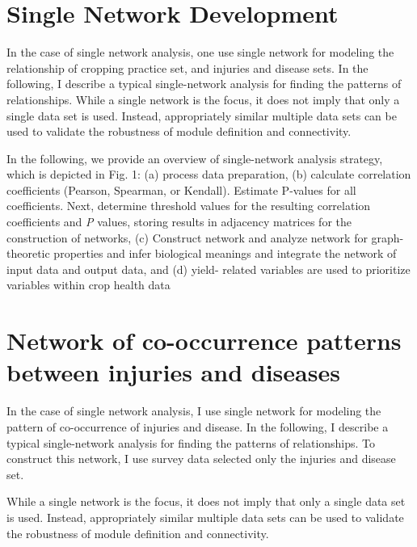 \section*{Single Network Development}
In the case of single network analysis, one use single network for modeling the relationship of cropping practice set, and injuries and disease sets. In the following, I describe a typical single-network analysis for finding the patterns of relationships.
While a single network is the focus, it does not imply that only a single data set is used. Instead, appropriately similar multiple data sets can be used to validate the robustness of module definition and connectivity.

In the following, we provide an overview of single-network analysis strategy, which is depicted in Fig. 1: (a) process data preparation, (b) calculate correlation coefficients (Pearson, Spearman, or Kendall). Estimate P-values for all coefficients. Next, determine threshold values for the resulting correlation coefficients and \textit{P} values, storing results in adjacency matrices for the construction of networks, (c) Construct network and analyze network for graph-theoretic properties and infer biological meanings and integrate the network of input data and output data, and (d) yield- related variables are used to prioritize variables within crop health data

\section*{Network of co-occurrence patterns between injuries and diseases}

In the case of single network analysis, I use single network for modeling the pattern of co-occurrence of injuries and disease. In the following, I describe a typical single-network analysis for finding the patterns of relationships. To construct this network, I use survey data selected only the injuries and disease set.

While a single network is the focus, it does not imply that only a single data set is used. Instead, appropriately similar multiple data sets can be used to validate the robustness of module definition and connectivity.

